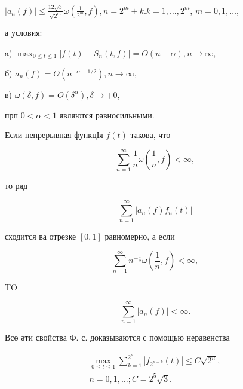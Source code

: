 \documentclass[10pt]{article}
\begin{document}
$\left|a_{n}(f)\right| \leqslant \frac{12 \sqrt{3}}{\sqrt{2^{m}}} \omega\left(\frac{1}{2^{m}}, f\right), n=2^{m}+k . k=1, \ldots, 2^{m}$, $m=0,1, \ldots$,



а условия:



a) $\max _{0 \leqslant t \leqslant 1}\left|f(t)-S_{n}(t, f)\right|=O(n-\alpha), n \rightarrow \infty$,



б) $a_{n}(f)=O\left(n^{-\alpha-1 / 2}\right), n \rightarrow \infty$,



в) $\omega(\delta, f)=O\left(\delta^{\alpha}\right), \delta \rightarrow+0$,



прп $0<\alpha<1$ являются равносильными.



Если непрерывная функцІя $f(t)$ такова, что



\[

\sum_{n=1}^{\infty} \frac{1}{n} \omega\left(\frac{1}{n}, f\right)<\infty,

\]



то ряд



\[

\sum_{n=1}^{\infty}\left|a_{n}(f) f_{n}(t)\right|

\]



сходится ва отрезке $[0,1]$ равномерно, а если



\[

\sum_{n=1}^{\infty} n^{-\frac{1}{2}} \omega\left(\frac{1}{n}, f\right)<\infty,

\]



TO



\[

\sum_{n=1}^{\infty}\left|a_{n}(f)\right|<\infty .

\]



Всө әти свойства Ф. с. доказываются с помощью неравенства



\[

\begin{gathered}

\max _{0 \leqslant t \leqslant 1} \sum_{k=1}^{2^{n}}\left|f_{2^{n+k}}(t)\right| \leqslant C \sqrt{2^{n}}, \\

n=0,1, \ldots ; C=2^{5} \sqrt{3} .

\end{gathered}

\]
\end{document}
